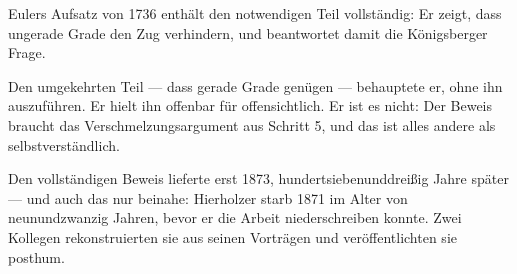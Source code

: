\begin{geschichte}
Eulers Aufsatz von 1736 enthält den notwendigen Teil vollständig: Er zeigt, dass ungerade Grade den Zug verhindern, und beantwortet damit die Königsberger Frage.

Den umgekehrten Teil --- dass gerade Grade genügen --- behauptete er, ohne ihn auszuführen. Er hielt ihn offenbar für offensichtlich. Er ist es nicht: Der Beweis braucht das Verschmelzungsargument aus Schritt 5, und das ist alles andere als selbstverständlich.

Den vollständigen Beweis lieferte  erst 1873, hundertsiebenunddreißig Jahre später --- und auch das nur beinahe: Hierholzer starb 1871 im Alter von neunundzwanzig Jahren, bevor er die Arbeit niederschreiben konnte. Zwei Kollegen rekonstruierten sie aus seinen Vorträgen und veröffentlichten sie posthum.

\begin{center}
\begin{minipage}{0.9\textwidth}
\end{minipage}
\end{center}
\end{geschichte}

